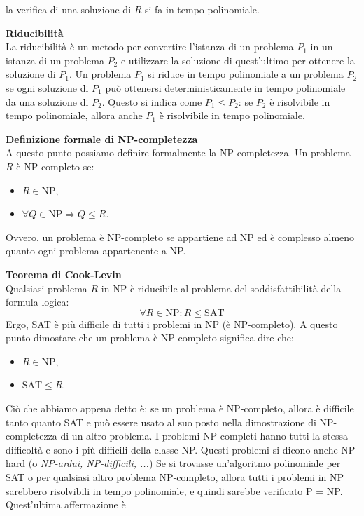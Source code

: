 \documentclass[a4paper,12pt]{article}
\begin{document}
la verifica di una soluzione di $R$ si fa in tempo polinomiale.
\par\smallskip
\par\smallskip
\textbf{Riducibilità} \\
La riducibilità è un metodo per convertire l'istanza di un problema $P_1$ in un istanza di un problema $P_2$ e utilizzare
la soluzione di quest'ultimo per ottenere la soluzione di $P_1$. Un problema $P_1$ si riduce in tempo polinomiale a un problema
$P_2$ se ogni soluzione di $P_1$ può ottenersi deterministicamente in tempo polinomiale da una soluzione di $P_2$. Questo si indica come
$P_1 \leq P_2$: se $P_2$ è risolvibile in tempo polinomiale, allora anche $P_1$ è risolvibile in tempo polinomiale.
\par\smallskip
\textbf{Definizione formale di NP-completezza} \\
A questo punto possiamo definire formalmente la NP-completezza. Un problema $R$ è NP-completo se:
\begin{itemize}
  \item $R \in \mathrm{NP}$,
  \item $\forall Q \in \mathrm{NP} \Rightarrow Q \leq R$.
\end{itemize}
Ovvero, un problema è NP-completo se appartiene ad NP ed è complesso almeno quanto ogni problema appartenente a NP.
\par\smallskip
\textbf{Teorema di Cook-Levin} \\
Qualsiasi problema $R$ in NP è riducibile al problema del soddisfattibilità della formula logica:
$$ \forall R \in \mathrm{NP} : R \leq \mathrm{SAT} $$
Ergo, SAT è più difficile di tutti i problemi in NP (è NP-completo).
A questo punto dimostare che un problema è NP-completo significa dire che:
\begin{itemize}
  \item  $R \in \mathrm{NP}$,
  \item $\mathrm{SAT} \leq R$.
\end{itemize}
Ciò che abbiamo appena detto è: se un problema è NP-completo, allora è difficile tanto quanto SAT e può essere usato
al suo posto nella dimostrazione di NP-completezza di un altro problema. I problemi NP-completi hanno tutti la stessa difficoltà
e sono i più difficili della classe NP. Questi problemi si dicono anche NP-hard (o \textit{NP-ardui, NP-difficili, ...}) Se si trovasse un'algoritmo polinomiale per SAT o per qualsiasi altro problema NP-completo,
allora tutti i problemi in NP sarebbero risolvibili in tempo polinomiale, e quindi sarebbe verificato P = NP. Quest'ultima affermazione è
\end{document}
